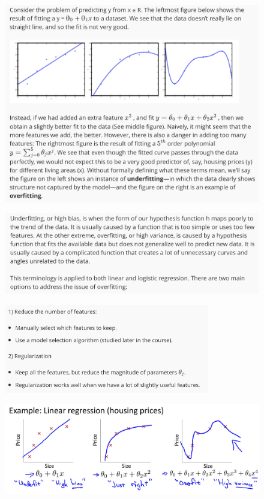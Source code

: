 \documentclass[12pt, A4,onecolumn]{article} %
\begin{document}
\begin{figure}[H]
	\centering
	\includegraphics[width=1\textwidth]{./Imagenes/overfit1}
\end{figure}

\begin{figure}[H]
	\centering
	\includegraphics[width=1\textwidth]{./Imagenes/overfit2}
\end{figure}

\begin{figure}[H]
	\centering
	\includegraphics[width=0.8\textwidth]{./Imagenes/overfit3}
\end{figure}

\begin{figure}[H]
	\centering
	\includegraphics[width=1\textwidth]{./Imagenes/overfit4}
\end{figure}
\end{document}
